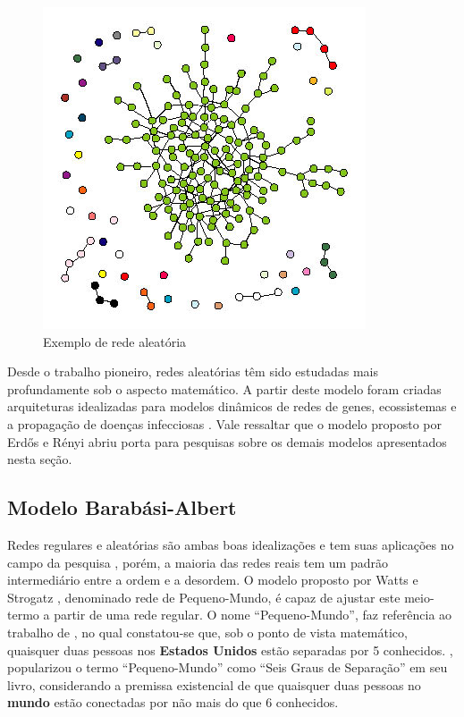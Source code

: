 \begin{figure}[!htb]
\centering
\includegraphics[scale=0.8]{./imagens/graph_random.png}
\caption{Exemplo de rede aleatória \cite{strogatz2001exploring}}
\label{graph_random}
\end{figure}

Desde o trabalho pioneiro, redes aleatórias têm sido estudadas mais profundamente sob o aspecto matemático\cite{bollobas2001random}. A partir deste modelo foram criadas arquiteturas idealizadas para modelos dinâmicos de redes de genes, ecossistemas e a propagação de doenças infecciosas \cite{strogatz2001exploring}. Vale ressaltar que o modelo proposto por Erdős e Rényi abriu porta para pesquisas sobre os demais modelos apresentados nesta seção.

\subsection{Modelo Barabási-Albert}

Redes regulares e aleatórias são ambas boas idealizações e tem suas aplicações no campo da pesquisa \cite{strogatz2001exploring}, porém, a maioria das redes reais tem um padrão intermediário entre a ordem e a desordem. O modelo proposto por Watts e Strogatz \cite{watts1998collective}, denominado rede de Pequeno-Mundo, é capaz de ajustar este meio-termo a partir de uma rede regular. O nome “Pequeno-Mundo”, faz referência ao trabalho de \cite{milgram1967small}, no qual constatou-se que, sob o ponto de vista matemático, quaisquer duas pessoas nos \textbf{Estados Unidos} estão separadas por 5 conhecidos. \cite{guare1992six}, popularizou o termo “Pequeno-Mundo” como “Seis Graus de Separação” em seu livro, considerando a premissa existencial de que quaisquer duas pessoas no \textbf{mundo} estão conectadas por não mais do que 6 conhecidos.

